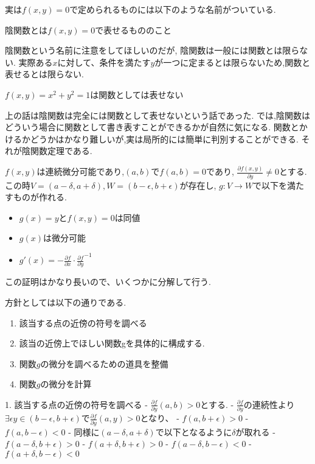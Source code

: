 \documentclass{ujarticle}
\begin{document}
実は$f(x,y) = 0$で定められるものには以下のような名前がついている.
\begin{dfn}
陰関数とは$f(x, y) = 0$で表せるもののこと
\end{dfn}

陰関数という名前に注意をしてほしいのだが,
陰関数は一般には関数とは限らない.
実際ある$x$に対して、条件を満たす$y$が一つに定まるとは限らないため,関数と表せるとは限らない.

\begin{epl}
$f(x , y) = x^2 + y^2 = 1$は関数としては表せない
\end{epl}

上の話は陰関数は完全には関数として表せないという話であった.
では,陰関数はどういう場合に関数として書き表すことができるかが自然に気になる.
関数とかけるかどうかはかなり難しいが,実は局所的には簡単に判別することができる.
それが陰関数定理である.

\begin{thm}
$f(x ,y)$は連続微分可能であり,$(a, b)$で$f(a , b) = 0$であり,
$\frac{\partial f(x, y)}{\partial y} \neq 0$とする.
この時$V = (a - \delta, a + \delta),W = (b - \epsilon , b + \epsilon)$が存在し,
$g:V \to W$で以下を満たすものが作れる.
\begin{itemize}
  \item $g(x) = y$と$f(x, y) = 0$は同値
  \item $g(x)$は微分可能
  \item $g'(x) = - \frac{\partial f}{\partial x} \cdot \frac{\partial f}{\partial y}^{-1}$
\end{itemize}
\end{thm}
この証明はかなり長いので、いくつかに分解して行う.

方針としては以下の通りである.

\begin{enumerate}
    \item 該当する点の近傍の符号を調べる
    \item 該当の近傍上でほしい関数gを具体的に構成する.
    \item 関数$g$の微分を調べるための道具を整備
    \item 関数$g$の微分を計算
\end{enumerate}

1. 該当する点の近傍の符号を調べる
- $\frac{\partial f}{\partial y}(a, b) > 0$とする.
- $\frac{\partial f}{\partial y}$の連続性より$\exists  \epsilon y \in (b - \epsilon, b + \epsilon)$で$\frac{\partial f}{\partial y}(a, y) > 0$となり、
  - $f(a, b + \epsilon) > 0$
  - $f(a, b - \epsilon) < 0$
- 同様に$(a - \delta, a + \delta)$で以下となるように$\delta$が取れる
  - $f(a - \delta, b + \epsilon) > 0$
  - $f(a + \delta, b + \epsilon) > 0$
  - $f(a - \delta, b - \epsilon) < 0$
  - $f(a + \delta, b - \epsilon) < 0$
\end{document}

